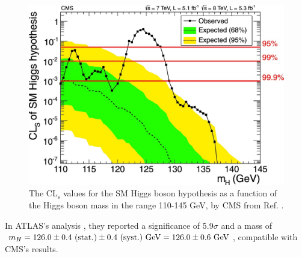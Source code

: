 \begin{figure}[!ht]
    \vspace*{-0.0cm}
    \centering
    \setlength{\mylength}{\textwidth}
    \includegraphics[width=0.60\mylength]{resources/CMS_Higgs_CLs.jpg}
    \vspace*{-0.0cm}
    \caption{The CL$_\text{s}$ values for the SM Higgs boson hypothesis as a function of the Higgs boson mass in the range 110-145 GeV, by CMS from Ref. \cite{CMS:2012qbp}.}
    \label{fig:CMS_Higgs_CLs}
    \vspace*{-0.3cm}
\end{figure}

In ATLAS's analysis \cite{ATLAS:2012yve}, they reported a significance of 5.9$\sigma$ and a mass of $m_H=126.0\pm0.4\text{ (stat.)}\pm0.4\text{ (syst.)}\ \text{GeV} = 126.0\pm0.6\ \text{GeV}$, compatible with CMS's results.